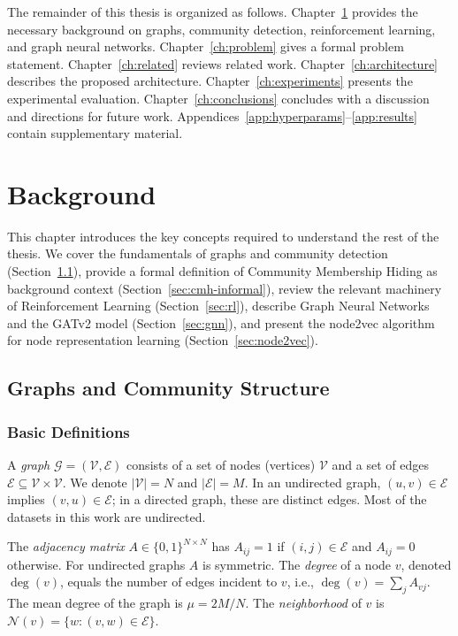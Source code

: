 \documentclass[11pt,a4paper,twoside]{tesis}
\newcommand{\G}{\mathcal{G}}
\newcommand{\V}{\mathcal{V}}
\newcommand{\E}{\mathcal{E}}
\begin{document}
The remainder of this thesis is organized as follows. Chapter~\ref{ch:background}
provides the necessary background on graphs, community detection, reinforcement learning,
and graph neural networks. Chapter~\ref{ch:problem} gives a formal problem statement.
Chapter~\ref{ch:related} reviews related work.
Chapter~\ref{ch:architecture} describes the proposed architecture.
Chapter~\ref{ch:experiments} presents the experimental evaluation.
Chapter~\ref{ch:conclusions} concludes with a discussion and directions for future work.
Appendices~\ref{app:hyperparams}--\ref{app:results} contain supplementary material.


\chapter{Background}
\label{ch:background}

This chapter introduces the key concepts required to understand the rest of the thesis.
We cover the fundamentals of graphs and community detection (Section~\ref{sec:graphs}),
provide a formal definition of Community Membership Hiding as background context
(Section~\ref{sec:cmh-informal}), review the relevant machinery of Reinforcement
Learning (Section~\ref{sec:rl}), describe Graph Neural Networks and the GATv2 model
(Section~\ref{sec:gnn}), and present the node2vec algorithm for node representation
learning (Section~\ref{sec:node2vec}).

\section{Graphs and Community Structure}
\label{sec:graphs}

\subsection{Basic Definitions}

A \emph{graph} $\G = (\V, \E)$ consists of a set of nodes (vertices) $\V$ and a set
of edges $\E \subseteq \V \times \V$. We denote $|\V| = N$ and $|\E| = M$. In an
undirected graph, $(u,v) \in \E$ implies $(v,u) \in \E$; in a directed graph, these are
distinct edges. Most of the datasets in this work are undirected.

The \emph{adjacency matrix} $A \in \{0,1\}^{N \times N}$ has $A_{ij} = 1$ if $(i,j)
\in \E$ and $A_{ij} = 0$ otherwise. For undirected graphs $A$ is symmetric.
The \emph{degree} of a node $v$, denoted $\deg(v)$, equals the number of edges incident
to $v$, i.e., $\deg(v) = \sum_j A_{vj}$. The mean degree of the graph is
$\mu = 2M/N$. The \emph{neighborhood} of $v$ is $\mathcal{N}(v) = \{w : (v,w) \in \E\}$.
\end{document}
